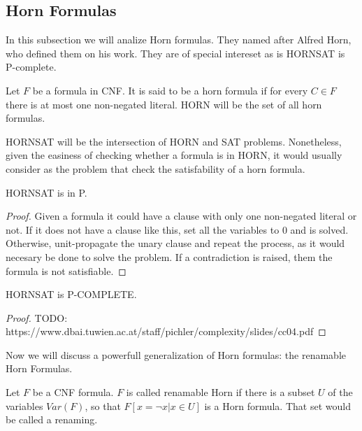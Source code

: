 \subsection{Horn Formulas}

In this subsection we will analize Horn formulas. They named after Alfred Horn, who defined them on his work\cite{horn1951sentences}. They are of special intereset as is HORNSAT is P-complete.


\begin{definition}
  Let $F$ be a formula in CNF. It is said to be a horn formula if for every $C \in F$ there is at most one non-negated literal. HORN will be the set of all horn formulas.

  HORNSAT will be the intersection of HORN and SAT problems. Nonetheless, given the easiness of checking whether a formula is in HORN, it would usually consider as the problem that check the satisfability of a horn formula.
\end{definition}


\begin{proposition}
  HORNSAT is in P.
\end{proposition}
\begin{proof}
  Given a formula it could have a clause with only one non-negated literal or not. If it does not have a clause like this, set all the variables to 0 and is solved. Otherwise, unit-propagate the unary clause and repeat the process, as it would necesary be done to solve the problem. If a contradiction is raised, them the formula is not satisfiable.
\end{proof}

\begin{theorem}
  HORNSAT is P-COMPLETE.
\end{theorem}

\begin{proof}
  TODO: https://www.dbai.tuwien.ac.at/staff/pichler/complexity/slides/cc04.pdf
\end{proof}

Now we will discuss a powerfull generalization of Horn formulas: the renamable Horn Formulas. 

\begin{definition}
  Let $F$ be a CNF formula. $F$ is called renamable Horn if there is a subset $U$ of the variables $Var(F)$, so that $F[x=\neg x | x \in U]$ is a Horn formula.
  That set would be called a renaming.
\end{definition}






